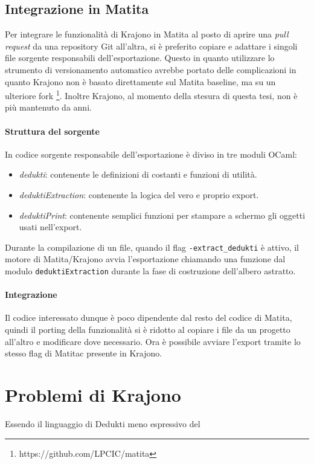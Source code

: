 \documentclass[12pt,a4paper]{report}
\begin{document}
\subsection{Integrazione in Matita}
Per integrare le funzionalità di Krajono in Matita al posto di aprire una \textit{
pull request} da una repository Git all'altra, si è preferito copiare e adattare i
singoli file sorgente responsabili dell'esportazione. Questo in quanto utilizzare
lo strumento di versionamento automatico avrebbe portato delle complicazioni in
quanto Krajono non è basato direttamente sul Matita baseline, ma su un ulteriore
fork \footnote{https://github.com/LPCIC/matita}. Inoltre Krajono, al momento della
stesura di questa tesi, non è più mantenuto da anni. 

\paragraph{Struttura del sorgente}
In codice sorgente responsabile dell'esportazione è diviso in tre moduli OCaml:
\begin{itemize}
  \item \textit{dedukti}: contenente le definizioni di costanti e funzioni
    di utilità.
  \item \textit{deduktiExtraction}: contenente la logica del vero e proprio 
    export.
  \item \textit{deduktiPrint}: contenente semplici funzioni per stampare a 
    schermo gli oggetti usati nell'export.
\end{itemize}

Durante la compilazione di un file, quando il flag \texttt{-extract\_dedukti} è
attivo, il motore di Matita/Krajono avvia l'esportazione chiamando una funzione
dal modulo \texttt{deduktiExtraction} durante la fase di costruzione dell'albero
astratto.

\paragraph{Integrazione}
Il codice interessato dunque è poco dipendente dal resto del codice di Matita,
quindi il porting della funzionalità si è ridotto al copiare i file da un progetto
all'altro e modificare dove necessario. Ora è possibile avviare l'export tramite
lo stesso flag di Matitac presente in Krajono.


\section{Problemi di Krajono} \label{ProblemiKrajono}
Essendo il linguaggio di Dedukti meno espressivo del 
\end{document}
